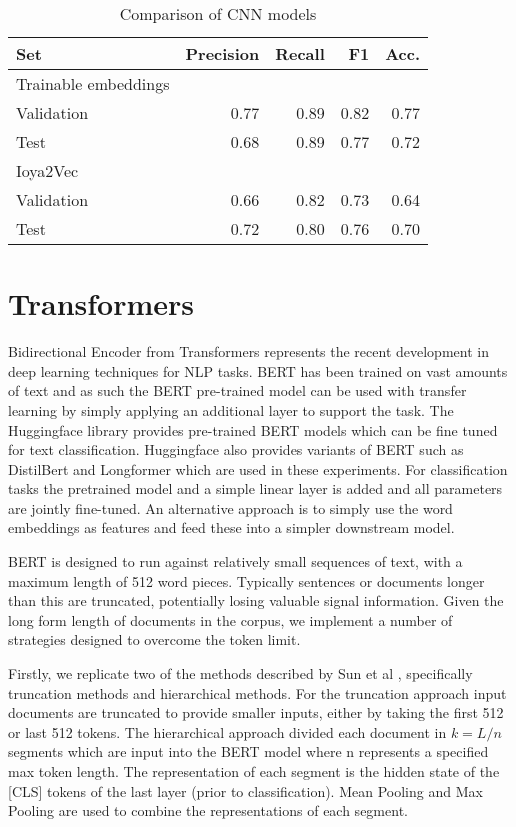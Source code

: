 \documentclass[twocolumn,10pt]{wmrDoc}
\begin{document}
\begin{table}
 \caption{Comparison of CNN models}
  \centering
  \begin{tabular}{lrrrr}
    \toprule
    Set & Precision & Recall & F1 & Acc.\\
    \midrule
    Trainable embeddings \\
    Validation & 0.77 & 0.89 & 0.82 & 0.77 \\
    Test & 0.68 & 0.89 & 0.77 & 0.72  \\
    \midrule
    Ioya2Vec \\
    Validation & 0.66 & 0.82 & 0.73 & 0.64 \\
    Test   & 0.72 & 0.80 & 0.76 & 0.70  \\
    \bottomrule
  \end{tabular}
  \label{tab:cnn}
\end{table}

\section{Transformers}
Bidirectional Encoder from Transformers \cite{devlin} represents the recent development in deep learning techniques for NLP tasks. BERT has been trained on vast amounts of text and as such the BERT pre-trained model can be used with transfer learning by simply applying an additional layer to support the task. The Huggingface library provides pre-trained BERT models which can be fine tuned for text classification. Huggingface also provides  variants of BERT such as DistilBert and Longformer which are used in these experiments. For classification tasks the pretrained model and a simple linear layer is added and all parameters are jointly fine-tuned. An alternative approach is to simply use the word embeddings as features and feed these into a simpler downstream model. 

BERT is designed to run against relatively small sequences of text, with a maximum length of 512 word pieces. Typically sentences or documents longer than this are truncated, potentially losing valuable signal information. Given the long form length of documents in the corpus, we implement a number of strategies designed to overcome the token limit.

Firstly, we replicate two of the methods described by Sun et al \cite{sun}, specifically truncation methods and hierarchical methods. For the truncation approach input documents are truncated to provide smaller inputs, either by taking the first 512 or last 512 tokens. The hierarchical approach divided each document in $k = L/n$ segments which are input into the BERT model where n represents a specified max token length. The representation of each segment is the hidden state of the [CLS] tokens of the last layer (prior to classification). Mean Pooling and Max Pooling are used to combine the representations of each segment.
\end{document}
